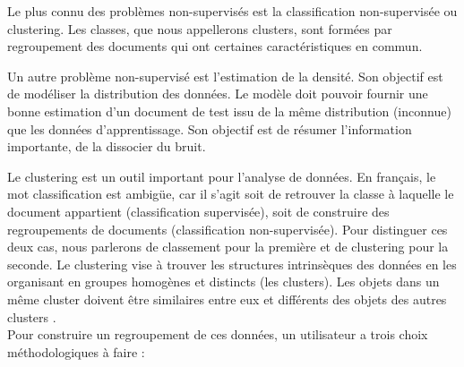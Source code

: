 \documentclass[12pt]{article}
\begin{document}
Le plus connu des problèmes non-supervisés est la classification non-supervisée ou clustering. Les classes, que nous appellerons clusters, sont formées par regroupement des documents qui ont certaines caractéristiques en commun.

Un autre problème non-supervisé est l'estimation de la densité. Son objectif est de modéliser la distribution des données. Le modèle doit pouvoir fournir une bonne estimation d'un document de test issu de la même distribution (inconnue) que les données d'apprentissage. Son objectif est de résumer l'information importante, de la dissocier du bruit.

Le clustering est un outil important pour l'analyse de données. En français, le mot classification est ambigüe, car il s'agit soit de retrouver la classe à laquelle le document appartient (classification supervisée), soit de construire des regroupements de documents (classification non-supervisée). Pour distinguer ces deux cas, nous parlerons de classement pour la première et de clustering pour la seconde. Le clustering vise à trouver les structures intrinsèques des données en les organisant en groupes homogènes et distincts (les clusters). Les objets dans un même cluster doivent être similaires entre eux et différents des objets des autres clusters \cite{3}.\\
Pour construire un regroupement de ces données, un utilisateur a trois choix méthodologiques à faire :
\end{document}
